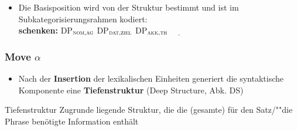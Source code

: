 \begin{frame}
	
	\begin{itemize}
		\item Die Basisposition wird von der Struktur bestimmt und ist im Subkategorisierungsrahmen kodiert:\\
		\textbf{schenken:} DP$_{\textsc{nom,ag}}$ DP$_{\textsc{dat,ziel}}$  DP$_{\textsc{akk,th}}$ $\underline{\qquad}$
	\end{itemize} 
	
	\begin{figure}
		\centering
	\end{figure}
	
\end{frame}


\begin{frame}
	\frametitle{Move $\alpha$}
	
	\begin{itemize}
		\item Nach der \textbf{Insertion} der lexikalischen Einheiten generiert die syntaktische Komponente eine \textbf{Tiefenstruktur} (Deep Structure, Abk. DS)
	\end{itemize}
	
	\begin{block}{Tiefenstruktur}
		Zugrunde liegende Struktur, die die (gesamte) für den Satz/""die Phrase benötigte Information enthält
	\end{block}
	
\end{frame}



